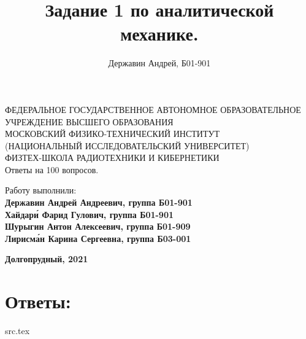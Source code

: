 \documentclass[15pt,a4paper,reqno]{article}
\title{Задание 1 по аналитической механике.}
\author{Державин Андрей, Б01-901}
\date{}
\begin{document}
\begin{center}
  \hfill \break
  \hfill \break
  {\small ФЕДЕРАЛЬНОЕ ГОСУДАРСТВЕННОЕ АВТОНОМНОЕ ОБРАЗОВАТЕЛЬНОЕ\\ УЧРЕЖДЕНИЕ ВЫСШЕГО ОБРАЗОВАНИЯ\\ МОСКОВСКИЙ ФИЗИКО-ТЕХНИЧЕСКИЙ ИНСТИТУТ\\ (НАЦИОНАЛЬНЫЙ ИССЛЕДОВАТЕЛЬСКИЙ УНИВЕРСИТЕТ)\\ ФИЗТЕХ-ШКОЛА РАДИОТЕХНИКИ И КИБЕРНЕТИКИ}\\
  \hfill \break
  \hfill \break
  \hfill \break
  \hfill \break
  \hfill \break
  \hfill \break
  \Huge{Ответы на 100 вопросов.}\\
\end{center}
\hfill \break
\hfill \break
\hfill \break
\hfill \break
\hfill \break
\hfill \break
\hfill \break
\hfill \break

\hfill \break
\hfill \break
\hfill \break
\hfill \break
\hfill \break
\hfill \break

\begin{flushright}
  \normalsize{Работу выполнили:}\\
  \normalsize{\textbf{Державин Андрей Андреевич, группа Б01-901}}\\
  \normalsize{\textbf{Хайдар\'{и} Фарид Гулович, группа Б01-901}}\\
  \normalsize{\textbf{Шурыгин Антон Алексеевич, группа Б01-909}}\\
  \normalsize{\textbf{Лирисм\'{а}н Карина Сергеевна, группа Б03-001}}
\end{flushright}

\begin{center}
  \normalsize{\textbf{Долгопрудный, 2021}}
\end{center}


\thispagestyle{empty} %


\newpage
\thispagestyle{plain}
\tableofcontents
\thispagestyle{plain}
\newpage


\section{Ответы:}
{src.tex}
\end{document}
